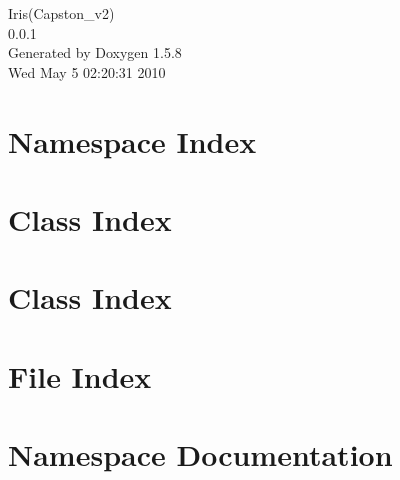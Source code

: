 \documentclass[a4paper]{book}
\begin{document}
\begin{titlepage}
\vspace*{7cm}
\begin{center}
{\Large Iris(Capston\_\-v2) \\[1ex]\large 0.0.1 }\\
\vspace*{1cm}
{\large Generated by Doxygen 1.5.8}\\
\vspace*{0.5cm}
{\small Wed May 5 02:20:31 2010}\\
\end{center}
\end{titlepage}
\clearemptydoublepage
{}
\tableofcontents
\clearemptydoublepage
{}
\chapter{Namespace Index}

\chapter{Class Index}

\chapter{Class Index}

\chapter{File Index}

\chapter{Namespace Documentation}

\end{document}
